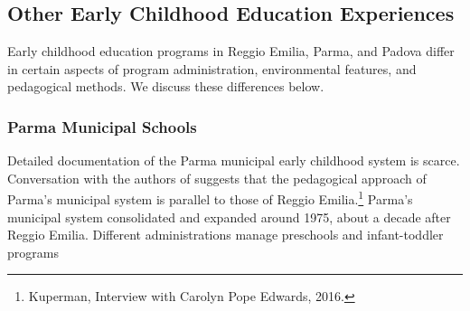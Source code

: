 
\subsection{Other Early Childhood Education Experiences}

Early childhood education programs in Reggio Emilia, Parma, and Padova differ in certain aspects of program administration, environmental features, and pedagogical methods. We discuss these differences below. 


\subsubsection{Parma Municipal Schools}

Detailed documentation of the Parma municipal early childhood system is scarce. Conversation with the authors of \citet{Edwards-etal-eds_1998_Hundred-Languages} suggests that the pedagogical approach of Parma's municipal system is parallel to those of Reggio Emilia.\footnote{Kuperman, Interview with Carolyn Pope Edwards, 2016.} Parma's municipal system consolidated and expanded around 1975, about a decade after Reggio Emilia. Different administrations manage preschools and infant-toddler programs

